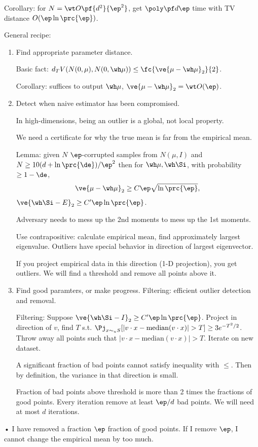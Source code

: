 Corollary: for $N=\wt O\pf{d^2}{\ep^2}$, get $\poly\pf d\ep$ time with TV distance $O(\ep \ln \prc{\ep})$. 

General recipe:
\begin{enumerate}
\item
Find appropriate parameter distance.

Basic fact: $d_TV(N(0,\mu), N(0,\wh \mu)) \le \fc{\ve{\mu-\wh \mu}_2}{2}$.

Corollary: suffices to output $\wh \mu$, $\ve{\mu - \wh \mu}_2=\wt O(\ep)$. 
\item
Detect when naive estimator has been compromised.

In high-dimensions, being an outlier is a global, not local property. 

We need a certificate for why the true mean is far from the empirical mean. 

Lemma: given $N$ $\ep$-corrupted samples from $N(\mu, I)$ and $N\ge 10(d+\ln \prc{\de})/\ep^2$ then for $\wh \mu, \wh \Si$, with probability $\ge 1-\de$, 
$$
\ve{\mu - \wh \mu}_2 \ge C\ep \sqrt{\ln \prc{\ep}},
$$
$\ve{\wh \Si - E}_2 \ge C'\ep\ln \prc{\ep}$. 

Adversary needs to mess up the 2nd moments to mess up the 1st moments.

Use contrapositive: calculate empirical mean, find approximately largest eigenvalue.  Outliers have special behavior in direction of largest eigenvector. 

If you project empirical data in this direction (1-D projection), you get outliers.  We will find a threshold and remove all points above it.
\item
Find good paramters, or make progress. Filtering: efficient outlier detection and removal.

Filtering: Suppose $\ve{\wh \Si - I}_2 \ge C'\ep\ln \prc{\ep}$. Project in direction of $v$, find $T$ s.t. $\Pj_{x\sim_uS} [|v\cdot x - \text{median}(v\cdot x)|>T] \ge 3e^{-T^2/2}$. Throw away all points such that $|v\cdot x - \text{median}(v\cdot x)|>T$. Iterate on new dataset.

A significant fraction of bad points cannot satisfy inequality with $\le$. Then by definition, the variance in that direction is small. 

Fraction of bad points above threshold is more than 2 times the fractions of good points. Every iteration remove at least $\ep/d$ bad points. We will need at most $d$ iterations.
\end{enumerate}•
I have removed a fraction $\ep$ fraction of good points. If I remove $\ep$, I cannot change the empirical mean by too much. 

